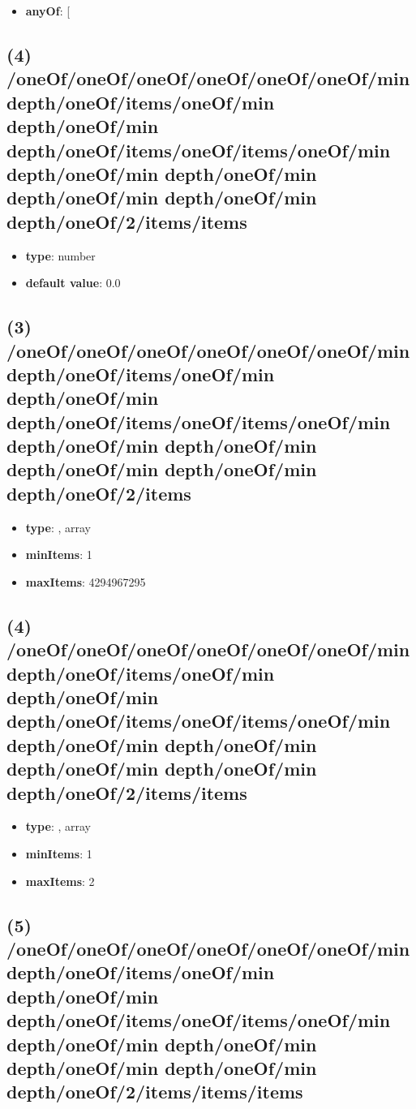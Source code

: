 \begin{itemize}[leftmargin=4em]\item {\bf anyOf}: [\end{itemize}\subsection{(4) /oneOf/oneOf/oneOf/oneOf/oneOf/oneOf/min depth/oneOf/items/oneOf/min depth/oneOf/min depth/oneOf/items/oneOf/items/oneOf/min depth/oneOf/min depth/oneOf/min depth/oneOf/min depth/oneOf/min depth/oneOf/2/items/items}
\begin{itemize}[leftmargin=4em]\item {\bf type}: number\item {\bf default value}: 0.0
\end{itemize}\subsection{(3) /oneOf/oneOf/oneOf/oneOf/oneOf/oneOf/min depth/oneOf/items/oneOf/min depth/oneOf/min depth/oneOf/items/oneOf/items/oneOf/min depth/oneOf/min depth/oneOf/min depth/oneOf/min depth/oneOf/min depth/oneOf/2/items}
\begin{itemize}[leftmargin=3em]\item {\bf type}: , array\item {\bf minItems}: 1
\item {\bf maxItems}: 4294967295
\end{itemize}\subsection{(4) /oneOf/oneOf/oneOf/oneOf/oneOf/oneOf/min depth/oneOf/items/oneOf/min depth/oneOf/min depth/oneOf/items/oneOf/items/oneOf/min depth/oneOf/min depth/oneOf/min depth/oneOf/min depth/oneOf/min depth/oneOf/2/items/items}
\begin{itemize}[leftmargin=4em]\item {\bf type}: , array\item {\bf minItems}: 1
\item {\bf maxItems}: 2
\end{itemize}\subsection{(5) /oneOf/oneOf/oneOf/oneOf/oneOf/oneOf/min depth/oneOf/items/oneOf/min depth/oneOf/min depth/oneOf/items/oneOf/items/oneOf/min depth/oneOf/min depth/oneOf/min depth/oneOf/min depth/oneOf/min depth/oneOf/2/items/items/items}
